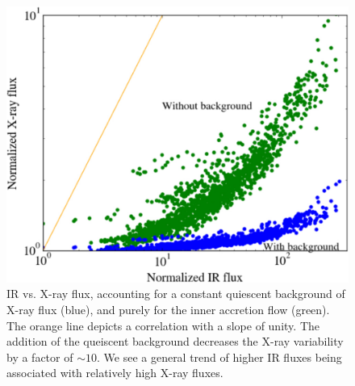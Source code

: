 \begin{figure}
	\centering
	\includegraphics[angle=0,width=\columnwidth]{paper1_fig8}
	\caption{IR vs. X-ray flux, accounting for a constant quiescent background of X-ray flux (blue), and purely for the inner accretion flow (green).  The orange line depicts a correlation with a slope of unity.  The addition of the queiscent background decreases the X-ray variability by a factor of $\sim 10$.  We see a general trend of higher IR fluxes being associated with relatively high X-ray fluxes.}
	\label{fig8}
\end{figure}



